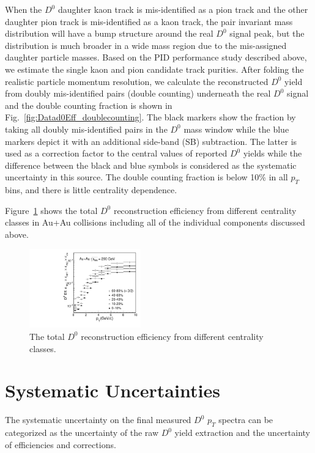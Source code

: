\documentclass[%
 reprint,	
 amsmath,amssymb,
 aps,
 prc,
]{revtex4-1}
\begin{document}
When the $D^0$ daughter kaon track is mis-identified as a pion track and the other daughter pion track is mis-identified as a kaon track, the pair invariant mass distribution will have a bump structure around the real $D^0$ signal peak, but the distribution is much broader in a wide mass region due to the mis-assigned daughter particle masses. Based on the PID  performance study described above, we estimate the single kaon and pion candidate track purities. After folding the realistic particle momentum resolution, we calculate the reconstructed $D^0$ yield from doubly mis-identified pairs (double counting) underneath the real $D^0$ signal and the double counting fraction is shown in Fig.~\ref{fig:Datad0Eff_doublecounting}. The black markers show the fraction by taking all doubly mis-identified pairs in the $D^0$ mass window while the blue markers depict it with an additional side-band (SB) subtraction. The latter is used as a correction factor to the central values of reported $D^0$ yields while the difference between the black and blue symbols is considered as the systematic uncertainty in this source. The double counting fraction is below 10\% in all $p_{T}$ bins, and there is little centrality dependence.

Figure~\ref{fig:Datad0Eff} shows the total $D^{0}$ reconstruction efficiency from different centrality classes in Au+Au collisions including all of the individual components discussed above.

\begin{figure}
\centering
\includegraphics[width=0.43\textwidth]{fig/Datad0Eff_10.pdf}
\caption{The total $D^{0}$ reconstruction efficiency from different centrality classes.}
\label{fig:Datad0Eff} 
\end{figure}

\section{Systematic Uncertainties}
\label{systematic}

The systematic uncertainty on the final measured $D^0$ $p_{T}$ spectra can be categorized as the uncertainty of the raw $D^0$ yield extraction and the uncertainty of efficiencies and corrections.
\end{document}
